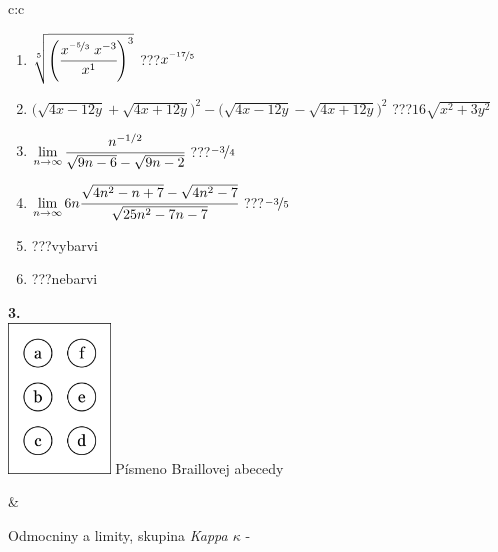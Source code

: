 \documentclass[10pt]{report}
\begin{document}
\begin{tabular}{c:c}
\begin{minipage}[c][104.5mm][t]{0.5\linewidth}
\begin{center}
\begin{minipage}{0.79\linewidth}
\begin{center}
\begin{varwidth}{\linewidth}
\begin{enumerate}
\small
\item $\sqrt[5]{\left(\cfrac{x^{\nicefrac{-5}{3}}\;x^{-3}}{x^{1}}\right)^{3}}$\quad \dotfill\; ???\;\dotfill \quad $x^{\nicefrac{-17}{5}}$
\item {\footnotesize{\scriptsize$\big(\sqrt{4x-12y}+\sqrt{4x+12y}\big)^2-\big(\sqrt{4x-12y}-\sqrt{4x+12y}\big)^2$}\quad \dotfill\; ???\;\dotfill \quad $16\sqrt{x^2+3y^2}$}
\item $\lim\limits_{n\to\infty}\cfrac{n^{-1/2}}{\sqrt{9n-6}-\sqrt{9n-2}}$\quad \dotfill\; ???\;\dotfill \quad $\nicefrac{-3}{4}$
\item $\lim\limits_{n\to\infty}6n\cfrac{\sqrt{4n^2-n+7}-\sqrt{4n^2-7}}{\sqrt{25n^2-7n-7}}$\quad \dotfill\; ???\;\dotfill \quad $\nicefrac{-3}{5}$
\item \quad \dotfill\; ???\;\dotfill \quad vybarvi
\item \quad \dotfill\; ???\;\dotfill \quad nebarvi
\end{enumerate}
\end{varwidth}
\end{center}
\end{minipage}
\begin{minipage}{0.20\linewidth}
\begin{center}
{\Huge\bfseries 3.} \\[2mm]
\includegraphics[height=40mm]{../images/braille.png}
{\small Písmeno Braillovej abecedy}
\end{center}
\end{minipage}
\end{center}
\end{minipage}
&
\begin{minipage}[c][104.5mm][t]{0.5\linewidth}
\begin{center}
\vspace{7mm}
{\huge Odmocniny a limity, skupina \textit{Kappa $\kappa$} -}\\[5mm]

\end{center}
\end{minipage}
\end{tabular}
\end{document}
